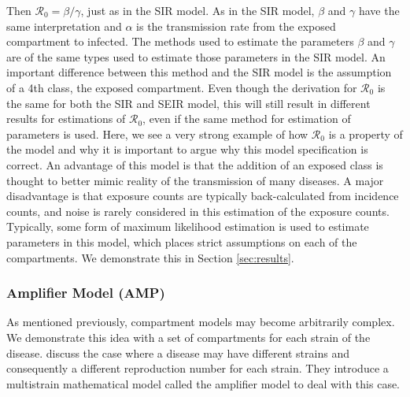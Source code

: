 \documentclass[12pt]{article}
\newcommand{\rr}{\ensuremath{\mathcal{R}_0}}
\begin{document}
Then $\rr = \beta / \gamma$, just as in the SIR model.  As in the SIR model, $\beta$ and $\gamma$ have the same interpretation and $\alpha$ is the transmission rate from the exposed compartment to infected.  The methods used to estimate the parameters $\beta$ and $\gamma$ are of the same types used to estimate those parameters in the SIR model.  An important difference between this method and the SIR model is the assumption of a 4th class, the exposed compartment.  Even though the derivation for $\rr$ is the same for both the SIR and SEIR model, this will still result in different results for estimations of $\rr$, even if the same method for estimation of parameters is used.  Here, we see a very strong example of how $\rr$ is a property of the model and why it is important to argue why this model specification is correct.  An advantage of this model is that the addition of an exposed class is thought to better mimic reality of the transmission of many diseases.  A major disadvantage is that exposure counts are typically back-calculated from incidence counts, and noise is rarely considered in this estimation of the exposure counts.   Typically, some form of maximum likelihood estimation is used to estimate parameters in this model, which places strict assumptions on each of the compartments. We demonstrate this in Section \ref{sec:results}.





\subsubsection{Amplifier Model (AMP)}
As mentioned previously, compartment models may become arbitrarily complex.  We demonstrate this idea with a set of compartments for each strain of the disease.  \cite{blower2004} discuss the case where a disease may have different strains and consequently a different reproduction number for each strain.  They introduce a multistrain mathematical model called the amplifier model to deal with this case.
\end{document}
